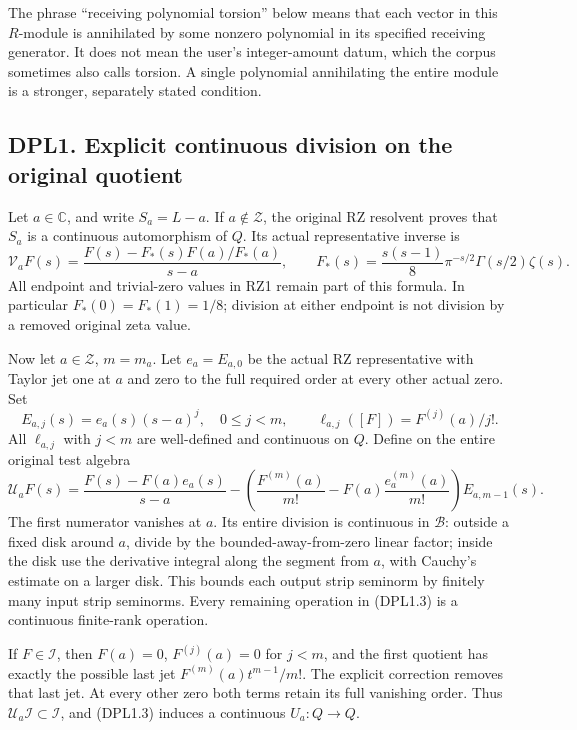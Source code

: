 The phrase ``receiving polynomial torsion'' below means that each vector
in this \(R\)-module is annihilated by some nonzero polynomial in its
specified receiving generator. It does not mean the user's
integer-amount datum, which the corpus sometimes also calls torsion. A
single polynomial annihilating the entire module is a stronger,
separately stated condition.

\subsection{DPL1. Explicit continuous division on the original
quotient}\label{dpl1.-explicit-continuous-division-on-the-original-quotient}

Let \(a\in\mathbb C\), and write \(S_a=L-a\). If \(a\notin\mathscr Z\),
the original RZ resolvent proves that \(S_a\) is a continuous
automorphism of \(Q\). Its actual representative inverse is \[
\mathscr V_aF(s)=
\frac{F(s)-F_*(s)F(a)/F_*(a)}{s-a},
\qquad
F_*(s)=\frac{s(s-1)}8\pi^{-s/2}\Gamma(s/2)\zeta(s).
\tag{DPL1.1}
\] All endpoint and trivial-zero values in RZ1 remain part of this
formula. In particular \(F_*(0)=F_*(1)=1/8\); division at either
endpoint is not division by a removed original zeta value.

Now let \(a\in\mathscr Z\), \(m=m_a\). Let \(e_a=E_{a,0}\) be the actual
RZ representative with Taylor jet one at \(a\) and zero to the full
required order at every other actual zero. Set \[
E_{a,j}(s)=e_a(s)(s-a)^j,\quad 0\le j<m,\qquad
\ell_{a,j}([F])=F^{(j)}(a)/j!.
\tag{DPL1.2}
\] All \(\ell_{a,j}\) with \(j<m\) are well-defined and continuous on
\(Q\). Define on the entire original test algebra \[
\mathscr U_aF(s)=
\frac{F(s)-F(a)e_a(s)}{s-a}
-\left(\frac{F^{(m)}(a)}{m!}
-F(a)\frac{e_a^{(m)}(a)}{m!}\right)E_{a,m-1}(s).
\tag{DPL1.3}
\] The first numerator vanishes at \(a\). Its entire division is
continuous in \(\mathcal B\): outside a fixed disk around \(a\), divide
by the bounded-away-from-zero linear factor; inside the disk use the
derivative integral along the segment from \(a\), with Cauchy's estimate
on a larger disk. This bounds each output strip seminorm by finitely
many input strip seminorms. Every remaining operation in (DPL1.3) is a
continuous finite-rank operation.

If \(F\in\mathcal I\), then \(F(a)=0\), \(F^{(j)}(a)=0\) for \(j<m\),
and the first quotient has exactly the possible last jet
\(F^{(m)}(a)t^{m-1}/m!\). The explicit correction removes that last jet.
At every other zero both terms retain its full vanishing order. Thus
\(\mathscr U_a\mathcal I\subset\mathcal I\), and (DPL1.3) induces a
continuous \(U_a:Q\to Q\).

